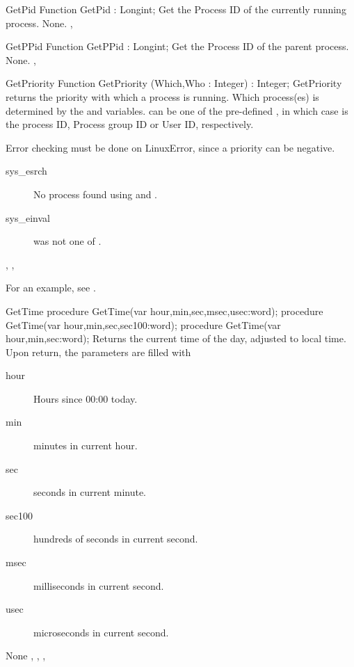 \begin{function}{GetPid}
\Declaration
Function GetPid  : Longint;
\Description
 Get the Process ID of the currently running process.
\Errors
None.
\SeeAlso
{}, 
\end{function}


\begin{function}{GetPPid}
\Declaration
Function GetPPid  : Longint;
\Description
 Get the Process ID of the parent process.
\Errors
None.
\SeeAlso
{}, 
\end{function}


\begin{function}{GetPriority}
\Declaration
Function GetPriority (Which,Who : Integer) : Integer;
\Description
GetPriority returns the priority with which a process is running.
Which process(es) is determined by the  and  variables.
 can be one of the pre-defined , in which case  is the process ID, Process group ID or
User ID, respectively.

\Errors

 Error checking must be done on LinuxError, since a priority can be negative.
 \begin{description}
 \item[sys\_esrch] No process found using  and .
 \item[sys\_einval]  was not one of .
 \end{description}
 
\SeeAlso
{}, , 
\end{function}
For an example, see .

\begin{procedure}{GetTime}
\Declaration
procedure GetTime(var hour,min,sec,msec,usec:word);
procedure GetTime(var hour,min,sec,sec100:word);
procedure GetTime(var hour,min,sec:word);
\Description
Returns the current time of the day, adjusted to local time.
Upon return, the parameters are filled with
\begin{description}
\item[hour] Hours since 00:00 today.
\item[min] minutes in current hour.
\item[sec] seconds in current minute.
\item[sec100] hundreds of seconds in current second.
\item[msec] milliseconds in current second.
\item[usec] microseconds in current second.
\end{description}
\Errors
None
\SeeAlso
{}, , ,  
\end{procedure}

